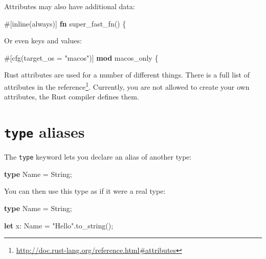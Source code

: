 \documentclass[a4paper,]{book}
\newenvironment{Shaded}{\begin{snugshade}}{\end{snugshade}}
\newcommand{\KeywordTok}[1]{\textcolor[rgb]{0.13,0.29,0.53}{\textbf{{#1}}}}
\newcommand{\DataTypeTok}[1]{\textcolor[rgb]{0.13,0.29,0.53}{{#1}}}
\newcommand{\StringTok}[1]{\textcolor[rgb]{0.31,0.60,0.02}{{#1}}}
\newcommand{\AttributeTok}[1]{\textcolor[rgb]{0.77,0.63,0.00}{{#1}}}
\newcommand{\NormalTok}[1]{{#1}}
\renewcommand{\href}[2]{#2\footnote{\url{#1}}}
\begin{document}
Attributes may also have additional data:

\begin{Shaded}
\begin{Highlighting}[]
\AttributeTok{#[}\NormalTok{inline}\AttributeTok{(}\NormalTok{always}\AttributeTok{)]}
\KeywordTok{fn} \NormalTok{super_fast_fn() \{}
\end{Highlighting}
\end{Shaded}

Or even keys and values:

\begin{Shaded}
\begin{Highlighting}[]
\AttributeTok{#[}\NormalTok{cfg}\AttributeTok{(}\NormalTok{target_os }\AttributeTok{=} \StringTok{"macos"}\AttributeTok{)]}
\KeywordTok{mod} \NormalTok{macos_only \{}
\end{Highlighting}
\end{Shaded}

Rust attributes are used for a number of different things. There is a
full list of attributes
\href{http://doc.rust-lang.org/reference.html\#attributes}{in the
reference}. Currently, you are not allowed to create your own
attributes, the Rust compiler defines them.

\section{\texorpdfstring{\texttt{type}
aliases}{type aliases}}\label{sec--type-aliases}

The \texttt{type} keyword lets you declare an alias of another type:

\begin{Shaded}
\begin{Highlighting}[]
\KeywordTok{type} \NormalTok{Name = }\DataTypeTok{String}\NormalTok{;}
\end{Highlighting}
\end{Shaded}

You can then use this type as if it were a real type:

\begin{Shaded}
\begin{Highlighting}[]
\KeywordTok{type} \NormalTok{Name = }\DataTypeTok{String}\NormalTok{;}

\KeywordTok{let} \NormalTok{x: Name = }\StringTok{"Hello"}\NormalTok{.to_string();}
\end{Highlighting}
\end{Shaded}
\end{document}
